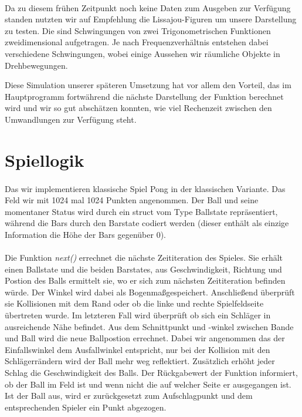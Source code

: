 \paragraph*{}
Da zu diesem frühen Zeitpunkt noch keine Daten zum Ausgeben zur Verfügung standen nutzten wir auf Empfehlung die Lissajou-Figuren um unsere Darstellung zu testen. Die sind Schwingungen von zwei Trigonometrischen Funktionen zweidimensional aufgetragen. Je nach Frequenzverhältnis entstehen dabei verschiedene Schwingungen, wobei einige Aussehen wir räumliche Objekte in Drehbewegungen. 



Diese Simulation unserer späteren Umsetzung hat vor allem den Vorteil, das im Hauptprogramm fortwährend die nächste Darstellung der Funktion berechnet wird und wir so gut abschätzen konnten, wie viel Rechenzeit zwischen den Umwandlungen zur Verfügung steht.

\section*{Spiellogik}

\paragraph*{}
Das wir implementieren klassische Spiel Pong in der klassischen Variante. Das Feld wir mit 1024 mal 1024 Punkten angenommen. Der Ball und seine momentaner Status wird durch ein struct vom Type Ballstate repräsentiert, während die Bars durch den Barstate codiert werden (dieser enthält als einzige Information die Höhe der Bars gegenüber 0). 

\paragraph*{}
Die Funktion {\em next()} errechnet die nächste Zeititeration des Spieles. Sie erhält einen Ballstate und die beiden Barstates, aus Geschwindigkeit, Richtung und Postion des Balls ermittelt sie, wo er sich zum nächsten Zeititeration befinden würde. Der Winkel wird dabei als Bogenmaßgespeichert. Anschließend überprüft sie Kollisionen mit dem Rand oder ob die linke und rechte Spielfeldseite übertreten wurde. Im letzteren Fall wird überprüft ob sich ein Schläger in ausreichende Nähe befindet. Aus dem Schnittpunkt und -winkel zwischen Bande und Ball wird die neue Ballpostion errechnet. Dabei wir angenommen das der Einfallswinkel dem Ausfallwinkel entspricht, nur bei der Kollision mit den Schlägerrändern wird der Ball mehr weg reflektiert.  Zusätzlich erhöht jeder Schlag die Geschwindigkeit des Balls. Der Rückgabewert der Funktion informiert, ob der Ball im Feld ist und wenn nicht die auf welcher Seite er ausgegangen ist. Ist der Ball aus, wird er zurückgesetzt zum Aufschlagpunkt und dem entsprechenden Spieler ein Punkt abgezogen. 

